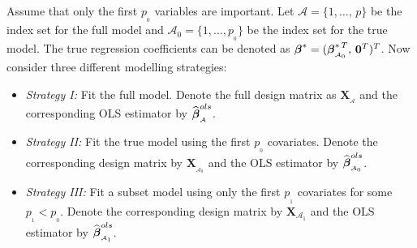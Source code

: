 \documentclass[11pt]{report}
\newcommand{\bfmath}[1]{\mbox{\boldmath$#1$\unboldmath}}
\begin{document}
\noindent
Assume that only the first $p_{_0}$ variables are important. Let $\mathcal{A} =\lbrace 1,\dots,\,p\rbrace$ be the index set for the full model and $\mathcal{A}_0=\lbrace 1,\dots, p_{_0}\rbrace$ be the index set for the true model. The
true regression coefficients can be denoted as $\bfmath{\beta}^\ast= (\bfmath{\beta}^{\ast\, T}_{_{\mathcal{A}_0}},\,\mathbf{0}^T)^T$. Now consider three
different modelling strategies: 
\begin{itemize}
\item[] {\it Strategy I:} Fit the full model. Denote the full design matrix as $\mathbf{X}_{_\mathcal{A}}$ and the corresponding OLS estimator by $\widehat{\bfmath{\beta}}^{ols}_{_\mathcal{A}}$. 
\item[] {\it Strategy II:} Fit the true model using the first $p_{_0}$ covariates. Denote the corresponding design matrix by $\mathbf{X}_{_{\mathcal{A}_0}}$ and the OLS estimator by $\widehat{\bfmath{\beta}}^{ols}_{_{\mathcal{A}_0}}$.
\item[] {\it Strategy III:} Fit a subset model using only the first $p_{_1}$ covariates for some $p_{_1}<p_{_0}$. Denote the corresponding design matrix by $\mathbf{X}_{\mathcal{A}_1}$ and the OLS estimator by $\widehat{\bfmath{\beta}}^{ols}_{_{\mathcal{A}_1}}$.  
\end{itemize}
\end{document}
